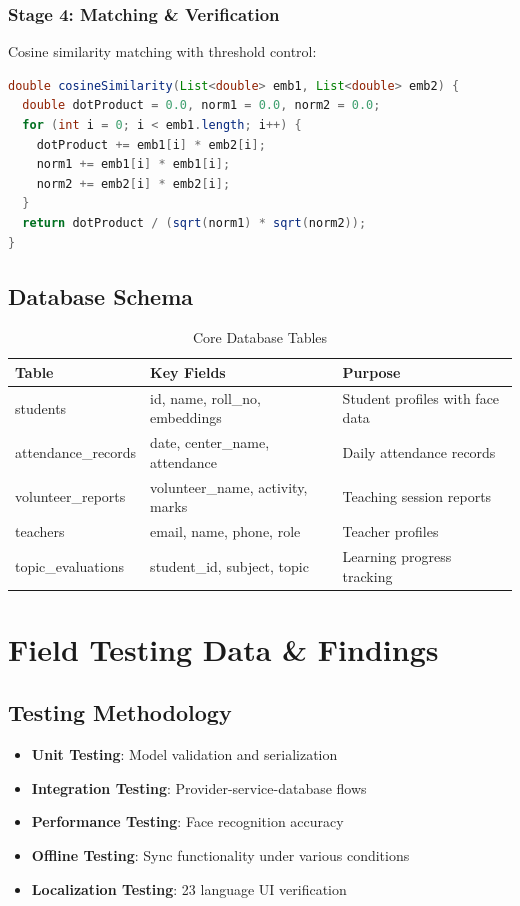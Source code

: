 \documentclass[12pt,a4paper]{article}
\begin{document}
\subsubsection{Stage 4: Matching \& Verification}
Cosine similarity matching with threshold control:
\begin{lstlisting}[language=Java, caption=Cosine Similarity Calculation]
double cosineSimilarity(List<double> emb1, List<double> emb2) {
  double dotProduct = 0.0, norm1 = 0.0, norm2 = 0.0;
  for (int i = 0; i < emb1.length; i++) {
    dotProduct += emb1[i] * emb2[i];
    norm1 += emb1[i] * emb1[i];
    norm2 += emb2[i] * emb2[i];
  }
  return dotProduct / (sqrt(norm1) * sqrt(norm2));
}
\end{lstlisting}

\subsection{Database Schema}
\begin{table}[H]
\centering
\small
\begin{tabularx}{\textwidth}{|l|l|X|}
\hline
\rowcolor{lightgray}
\textbf{Table} & \textbf{Key Fields} & \textbf{Purpose} \\
\hline
students & id, name, roll\_no, embeddings & Student profiles with face data \\
\hline
attendance\_records & date, center\_name, attendance & Daily attendance records \\
\hline
volunteer\_reports & volunteer\_name, activity, marks & Teaching session reports \\
\hline
teachers & email, name, phone, role & Teacher profiles \\
\hline
topic\_evaluations & student\_id, subject, topic & Learning progress tracking \\
\hline
\end{tabularx}
\caption{Core Database Tables}
\end{table}

\newpage

\section{Field Testing Data \& Findings}

\subsection{Testing Methodology}
\begin{itemize}[leftmargin=*, itemsep=0.2em]
    \item \textbf{Unit Testing}: Model validation and serialization
    \item \textbf{Integration Testing}: Provider-service-database flows
    \item \textbf{Performance Testing}: Face recognition accuracy
    \item \textbf{Offline Testing}: Sync functionality under various conditions
    \item \textbf{Localization Testing}: 23 language UI verification
\end{itemize}
\end{document}
